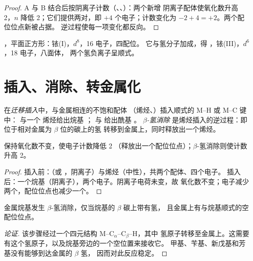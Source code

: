 \begin{proof}
A 与 B 结合后按阴离子计数（、、）：两个新增
阴离子配体使氧化数升高 2，$n$ 降低 2；它们提供两对，即 $+4$
个电子；计数变化为 $-2 + 4 = +2$。两个配位位点新被占据。
逆过程使每一项变化都反向。
\end{proof}

\begin{example}[瓦斯卡配合物]\label{ex:b2:catalytic-cycles:vaska}
，平面正方形：铱(I)，$d^8$，16 电子，四配位。
它与氢分子加成，得 ，铱(III)，$d^6$，18 电子，八面体，
两个氢负离子呈顺式。
\end{example}

\section{插入、消除、转金属化}

\begin{definition}\label{def:b2:catalytic-cycles:insertion}
在\emph{迁移插入}中，与金属相连的不饱和配体
（烯烃、）插入顺式的 M--H 或 M--C 键中： 与一个
烯烃给出烷基 ； 与  给出酰基 。
\emph{$\beta$-氢消除}
是烯烃插入的逆过程：即位于相对金属为 $\beta$ 位的碳上的氢
转移到金属上，同时释放出一个烯烃。
\end{definition}

\begin{proposition}[插入的计数]\label{prop:b2:catalytic-cycles:insertion}
保持氧化数不变，使电子计数降低 2
（释放出一个配位位点）；$\beta$-氢消除则使计数升高 2。
\end{proposition}

\begin{proof}
插入前：（或 ，阴离子）与烯烃（中性），共两个配体、四个电子。
插入后：一个烷基（阴离子），两个电子。阴离子电荷未变，故
氧化数不变；电子减少两个，配位位点也减少一个。
\end{proof}

\begin{proposition}\label{prop:b2:catalytic-cycles:beta-h}
金属烷基发生 $\beta$-氢消除，仅当烷基的 $\beta$ 碳上带有氢，
且金属上有与烷基顺式的空配位位点。
\end{proposition}

\begin{proof}[论证]
该步骤经过一个四元结构 M--C$_\alpha$--C$_\beta$--H，其中
氢原子转移至金属上。这需要有这个氢原子，以及烷基旁边的一个空位置来接收它。
甲基、苄基、新戊基和芳基没有能够到达金属的 $\beta$ 氢，
因而对此反应稳定。
\end{proof}

